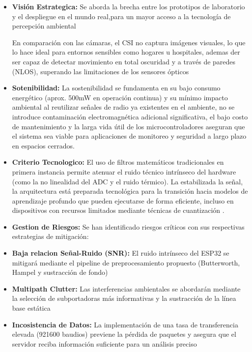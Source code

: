 \documentclass[12pt, a4paper]{article}
\begin{document}
\begin{itemize}

\item \textbf{Visión Estrategica:} 
Se aborda la brecha entre los prototipos de laboratorio y el despliegue en el mundo real,para un mayor acceso a la tecnología de percepción ambiental\cite{kim2026csi}

En comparación con las cámaras, el CSI no captura imágenes visuales, lo que lo hace ideal para entornos sensibles como hogares u hospitales\cite{geng2022denspose}\cite{9900419}, ademas der ser capaz de detectar movimiento en total oscuridad y a través de paredes (NLOS), superando las limitaciones de los sensores ópticos\cite{geng2022denspose}\cite{barahimi2024context}

\item \textbf{Sotenibilidad:}
La sostenibilidad se fundamenta en su bajo consumo energético (aprox. 500mW en operación continua) y su mínimo impacto ambiental al  reutilizar señales de radio ya existentes en el ambiente, no se introduce contaminación electromagnética adicional significativa\cite{custance2026why}\cite{kong2025cirsenserethinkingwifisensing}, el bajo costo de mantenimiento y la larga vida útil de los microcontroladores aseguran que el sistema sea viable para aplicaciones de monitoreo  y seguridad a largo plazo en espacios cerrados\cite{tong2024human}.


\item \textbf{Criterio Tecnologico:} 
 El uso de filtros matemáticos tradicionales en primera instancia permite atenuar el ruido técnico intrínseco del hardware (como la no linealidad del ADC y el ruido térmico)\cite{kim2026csi}\cite{kong2025cirsenserethinkingwifisensing}.
 La estabilizada la señal, la arquitectura está preparada tecnológica para la transición hacia modelos de aprendizaje profundo que pueden ejecutarse de forma eficiente, incluso en dispositivos con recursos limitados mediante técnicas de cuantización \cite{kim2026csi}\cite{yang2023sensefilibrarybenchmarkdeeplearningempowered}\cite{9900419}.

\item \textbf{Gestion de Riesgos:}
Se han identificado riesgos críticos con sus respectivas estrategias de mitigación:
\item \textbf{Baja relacion Señal-Ruido (SNR):} El ruido intrínseco del ESP32 se mitigará mediante el pipeline de preprocesamiento propuesto (Butterworth, Hampel y sustracción de fondo)\cite{kim2026csi} \cite{gaire2026staticsense} \cite{avola2025transformer}
\item \textbf{Multipath Clutter:} Las interferencias ambientales se abordarán mediante la selección de subportadoras más informativas y la sustracción de la línea base estática\cite{gaire2026staticsense}\cite{mosefi22}
\item \textbf{Incosistencia de Datos:} La implementación de una tasa de transferencia elevada (921600 baudios) previene la pérdida de paquetes y asegura que el servidor reciba información suficiente para un análisis preciso


\end{itemize}

\printbibliography
\end{document}
